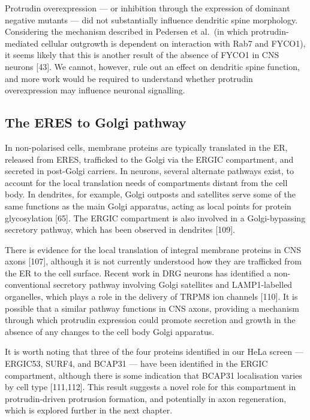 \documentclass[
  12pt,
  a4paper,
]{book}
\begin{document}
Protrudin overexpression --- or inhibition through the expression of dominant negative mutants --- did not substantially influence dendritic spine morphology. Considering the mechanism described in Pedersen et al.~(in which protrudin-mediated cellular outgrowth is dependent on interaction with Rab7 and FYCO1), it seems likely that this is another result of the absence of FYCO1 in CNS neurons {[}43{]}. We cannot, however, rule out an effect on dendritic spine function, and more work would be required to understand whether protrudin overexpression may influence neuronal signalling.

\hypertarget{the-eres-to-golgi-pathway}{%
\subsection{The ERES to Golgi pathway}\label{the-eres-to-golgi-pathway}}

In non-polarised cells, membrane proteins are typically translated in the ER, released from ERES, trafficked to the Golgi via the ERGIC compartment, and secreted in post-Golgi carriers. In neurons, several alternate pathways exist, to account for the local translation needs of compartments distant from the cell body. In dendrites, for example, Golgi outposts and satellites serve some of the same functions as the main Golgi apparatus, acting as local points for protein glycosylation {[}65{]}. The ERGIC compartment is also involved in a Golgi-bypassing secretory pathway, which has been observed in dendrites {[}109{]}.

There is evidence for the local translation of integral membrane proteins in CNS axons {[}107{]}, although it is not currently understood how they are trafficked from the ER to the cell surface. Recent work in DRG neurons has identified a non-conventional secretory pathway involving Golgi satellites and LAMP1-labelled organelles, which plays a role in the delivery of TRPM8 ion channels {[}110{]}. It is possible that a similar pathway functions in CNS axons, providing a mechanism through which protrudin expression could promote secretion and growth in the absence of any changes to the cell body Golgi apparatus.

It is worth noting that three of the four proteins identified in our HeLa screen --- ERGIC53, SURF4, and BCAP31 --- have been identified in the ERGIC compartment, although there is some indication that BCAP31 localisation varies by cell type {[}111,112{]}. This result suggests a novel role for this compartment in protrudin-driven protrusion formation, and potentially in axon regeneration, which is explored further in the next chapter.
\end{document}
